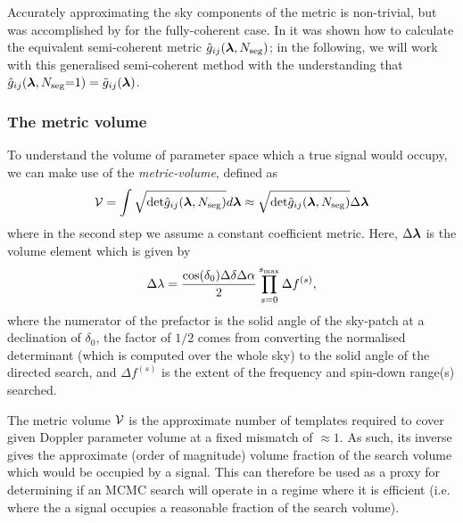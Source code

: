 \documentclass[aps, prd, twocolumn, superscriptaddress, floatfix, showpacs, nofootinbib, longbibliography]{revtex4-1}
\begin{document}
Accurately approximating the sky components of the metric is non-trivial, but
was accomplished by \citet{wette2013} for the fully-coherent case. In
\citet{wette2015} it was shown how to calculate the equivalent semi-coherent
metric $\hat{g}_{ij}(\boldsymbol{\mathbf{\lambda}}, N_{\rm seg})$; in the following, we
will work with this generalised semi-coherent method with the understanding
that $\hat{g}_{ij}(\boldsymbol{\mathbf{\lambda}}, N_{\rm seg}{=}1)=
\tilde{g}_{ij}(\boldsymbol{\mathbf{\lambda}})$.

\subsubsection{The metric volume}
To understand the volume of parameter space which a true signal would occupy,
we can make use of the \emph{metric-volume}, defined as \citep{prix2007}
\begin{align}
\mathcal{V} = \int
\sqrt{\textrm{det}\hat{g}_{ij}(\boldsymbol{\mathbf{\lambda}}, N_{\rm seg})} d\boldsymbol{\mathbf{\lambda}} \approx
\sqrt{\textrm{det}\hat{g}_{ij}(\boldsymbol{\mathbf{\lambda}}, N_{\rm seg})} \Delta\boldsymbol{\mathbf{\lambda}}
\end{align}
where in the second step we assume a constant coefficient metric. Here, $\Delta
\boldsymbol{\mathbf{\lambda}}$ is the volume element which is given by
\begin{equation}
\Delta\lambda = \frac{\cos(\delta_0)\Delta\delta\Delta\alpha}{2}
\prod_{s=0}^{s_{\textrm{max}}} \Delta f^{(s)},
\end{equation}
where the numerator of the prefactor is the solid angle of the sky-patch at a
declination of $\delta_0$, the factor of $1/2$ comes from converting the
normalised determinant (which is computed over the whole sky) to the solid angle
of the directed search, and $\Delta f^{(s)}$ is the extent of the frequency and
spin-down range(s) searched.

The metric volume $\mathcal{V}$ is the approximate number of templates required to cover
given Doppler parameter volume at a fixed mismatch of $\approx 1$. As
such, its inverse gives the approximate (order of magnitude) volume fraction of
the search volume which would be occupied by a signal. This can therefore be
used as a proxy for determining if an MCMC search will operate in a regime where
it is efficient (i.e. where the a signal occupies a reasonable fraction of the
search volume).
\end{document}
